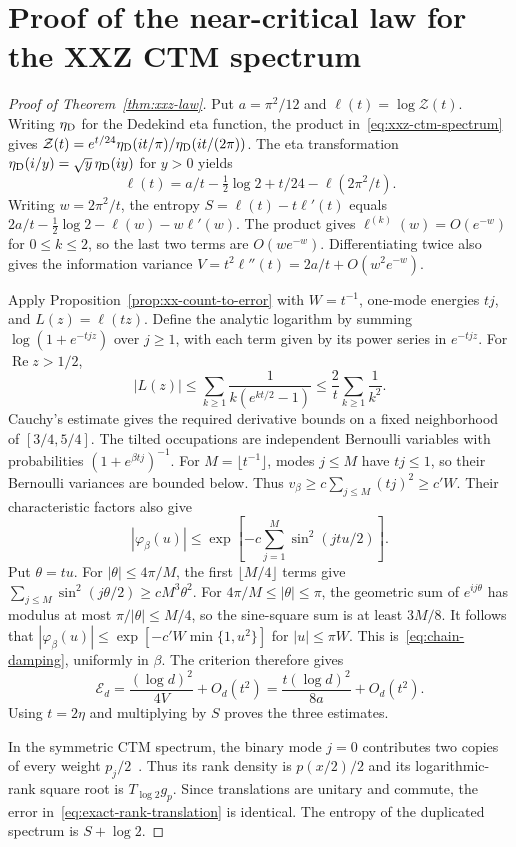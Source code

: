 \section{Proof of the near-critical law for the XXZ CTM spectrum}\label{app:xxz-law}

\begin{proof}[Proof of Theorem~\ref{thm:xxz-law}]
Put $a=\pi^2/12$ and $\ell(t)=\log\mathcal Z(t)$. Writing $\eta_{\rm D}$
for the Dedekind eta function, the product in~\eqref{eq:xxz-ctm-spectrum}
gives $\mathcal Z(t)=e^{t/24}\eta_{\rm D}(it/\pi)/\eta_{\rm D}(it/(2\pi))$.
The eta transformation $\eta_{\rm D}(i/y)=\sqrt y\,\eta_{\rm D}(iy)$
for $y>0$ yields
\[
 \ell(t)=a/t-\tfrac12\log2+t/24-\ell(2\pi^2/t).
\]
Writing $w=2\pi^2/t$, the entropy
$S=\ell(t)-t\ell'(t)$ equals
$2a/t-\tfrac12\log2-\ell(w)-w\ell'(w)$.
The product gives $\ell^{(k)}(w)=O(e^{-w})$ for $0\le k\le2$, so the
last two terms are $O(we^{-w})$. Differentiating twice also gives the
information variance $V=t^2\ell''(t)=2a/t+O(w^2e^{-w})$.

Apply Proposition~\ref{prop:xx-count-to-error} with $W=t^{-1}$,
one-mode energies $tj$, and $L(z)=\ell(tz)$. Define the analytic logarithm
by summing $\log(1+e^{-tjz})$ over $j\ge1$, with each term given by its
power series in $e^{-tjz}$. For $\operatorname{Re}z>1/2$,
\[
 |L(z)|\leq\sum_{k\ge1}\frac{1}{k(e^{kt/2}-1)}
       \leq\frac2t\sum_{k\ge1}\frac1{k^2}.
\]
Cauchy's estimate gives the required derivative bounds on a fixed
neighborhood of $[3/4,5/4]$. The tilted occupations are independent
Bernoulli variables with probabilities $(1+e^{\beta tj})^{-1}$.
For $M=\lfloor t^{-1}\rfloor$, modes $j\leq M$ have $tj\leq1$, so
their Bernoulli variances are bounded below. Thus
$v_\beta\geq c\sum_{j\leq M}(tj)^2\geq c'W$.
Their characteristic factors also give
\[
 |\varphi_\beta(u)|\leq
   \exp\!\left[-c\sum_{j=1}^M\sin^2(jtu/2)\right].
\]
Put $\theta=tu$. For $|\theta|\leq4\pi/M$, the first $\lfloor M/4\rfloor$
terms give $\sum_{j\leq M}\sin^2(j\theta/2)\geq cM^3\theta^2$.
For $4\pi/M\leq|\theta|\leq\pi$, the geometric sum of
$e^{ij\theta}$ has modulus at most $\pi/|\theta|\leq M/4$, so the
sine-square sum is at least $3M/8$. It follows that
$|\varphi_\beta(u)|\leq\exp[-c' W\min\{1,u^2\}]$ for $|u|\leq\pi W$.
This is~\eqref{eq:chain-damping}, uniformly in $\beta$. The criterion
therefore gives
\[
 \mathcal E_d=\frac{(\log d)^2}{4V}+O_d(t^2)
       =\frac{t(\log d)^2}{8a}+O_d(t^2).
\]
Using $t=2\eta$ and multiplying by $S$ proves the three estimates.

In the symmetric CTM spectrum, the binary mode $j=0$ contributes two
copies of every weight $p_j/2$~\cite[Sec.~4.1]{ACT18}. Thus its rank
density is $p(x/2)/2$ and its logarithmic-rank square root is
$T_{\log2}g_p$. Since translations are unitary and commute, the error
in~\eqref{eq:exact-rank-translation} is identical. The entropy of the
duplicated spectrum is $S+\log2$.
\end{proof}
